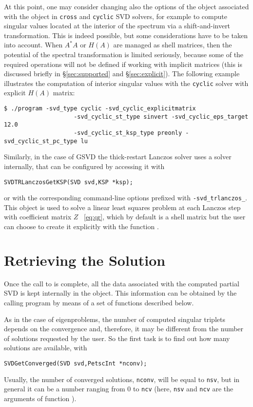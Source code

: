 At this point, one may consider changing also the options of the  object associated with the  object in \texttt{cross} and \texttt{cyclic} SVD solvers, for example to compute singular values located at the interior of the spectrum via a shift-and-invert transformation. This is indeed possible, but some considerations have to be taken into account. When $A^*A$ or $H(A)$ are managed as shell matrices, then the potential of the spectral transformation is limited seriously, because some of the required operations will not be defined if working with implicit matrices (this is discussed briefly in \S\ref{sec:supported} and \S\ref{sec:explicit}). The following example illustrates the computation of interior singular values with the \texttt{cyclic} solver with explicit $H(A)$ matrix:
\begin{Verbatim}[fontsize=\small]
        $ ./program -svd_type cyclic -svd_cyclic_explicitmatrix
                    -svd_cyclic_st_type sinvert -svd_cyclic_eps_target 12.0
                    -svd_cyclic_st_ksp_type preonly -svd_cyclic_st_pc_type lu
\end{Verbatim}

Similarly, in the case of GSVD the thick-restart Lanczos solver uses a  solver internally, that can be configured by accessing it with
        \begin{Verbatim}[fontsize=\small]
        SVDTRLanczosGetKSP(SVD svd,KSP *ksp);
        \end{Verbatim}
or with the corresponding command-line options prefixed with \texttt{-svd\_trlanczos\_}. This  object is used to solve a linear least squares problem at each Lanczos step with coefficient matrix $Z$
~\eqref{eq:qr}, which by default is a shell matrix but the user can choose to create it explicitly with the function .

\section{Retrieving the Solution}

Once the call to  is complete, all the data associated with the computed partial SVD is kept internally in the  object. This information can be obtained by the calling program by means of a set of functions described below.

As in the case of eigenproblems, the number of computed singular triplets depends on the convergence and, therefore, it may be different from the number of solutions requested by the user. So the first task is to find out how many solutions are available, with
        \begin{Verbatim}[fontsize=\small]
        SVDGetConverged(SVD svd,PetscInt *nconv);
        \end{Verbatim}
Usually, the number of converged solutions, \texttt{nconv}, will be equal to \texttt{nsv}, but in general it can be a number ranging from 0 to \texttt{ncv} (here, \texttt{nsv} and \texttt{ncv} are the arguments of function ).

